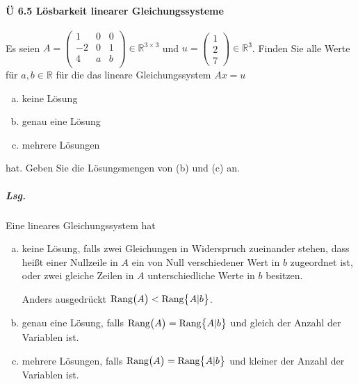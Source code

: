 \documentclass{scrreprt}
\begin{document}
\newpage
\paragraph{Ü 6.5 Lösbarkeit linearer Gleichungssysteme}
Es seien $A = \begin{pmatrix}
  1  & 0 & 0 \\
  -2 & 0 & 1 \\
  4  & a & b \\
\end{pmatrix} \in \mathbb{R}^{3 \times 3}$
und $u = \begin{pmatrix} 1 \\ 2 \\ 7 \end{pmatrix} \in \mathbb{R}^3$.
Finden Sie alle Werte für $a, b \in \mathbb{R}$ für die das lineare
Gleichungssystem $Ax = u$
\begin{enumerate}[(a)]
\item keine Lösung
\item genau eine Lösung
\item mehrere Lösungen
\end{enumerate}
hat.
Geben Sie die Lösungsmengen von (b) und (c) an.

\subparagraph{Lsg.} Eine lineares Gleichungssystem hat
\begin{enumerate}[(a)]
\item keine Lösung, falls zwei Gleichungen in Widerspruch zueinander stehen, dass
  heißt einer Nullzeile in $A$ ein von Null verschiedener Wert in $b$ zugeordnet
  ist, oder zwei gleiche Zeilen in $A$ unterschiedliche Werte in $b$ besitzen.

  Anders ausgedrückt $\text{Rang}\qty\big(A) < \text{Rang}\qty\big{A|b}$.

\item genau eine Lösung, falls
  $\text{Rang}\qty\big(A) = \text{Rang}\qty\big{A|b}$ und gleich der Anzahl der
  Variablen ist.

\item mehrere Lösungen, falls $\text{Rang}\qty\big(A) = \text{Rang}\qty\big{A|b}$
  und kleiner der Anzahl der Variablen ist.
\end{enumerate}
\end{document}
